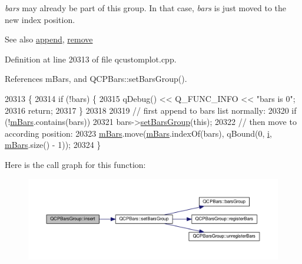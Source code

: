 {\itshape bars} may already be part of this group. In that case, {\itshape bars} is just moved to the new index position.

\begin{DoxySeeAlso}{See also}
\hyperlink{class_q_c_p_bars_group_a809ed63cc4ff7cd5b0b8c96b470163d3}{append}, \hyperlink{class_q_c_p_bars_group_a215e28a5944f1159013a0e19169220e7}{remove} 
\end{DoxySeeAlso}


Definition at line 20313 of file qcustomplot.\+cpp.



References m\+Bars, and Q\+C\+P\+Bars\+::set\+Bars\+Group().


\begin{DoxyCode}
20313                                               \{
20314   \textcolor{keywordflow}{if} (!bars) \{
20315     qDebug() << Q\_FUNC\_INFO << \textcolor{stringliteral}{"bars is 0"};
20316     \textcolor{keywordflow}{return};
20317   \}
20318 
20319   \textcolor{comment}{// first append to bars list normally:}
20320   \textcolor{keywordflow}{if} (!\hyperlink{class_q_c_p_bars_group_aa5affa0639c13e05bda9d23f16dd1393}{mBars}.contains(bars))
20321     bars->\hyperlink{class_q_c_p_bars_aedd1709061f0b307c47ddb45e172ef9a}{setBarsGroup}(\textcolor{keyword}{this});
20322   \textcolor{comment}{// then move to according position:}
20323   \hyperlink{class_q_c_p_bars_group_aa5affa0639c13e05bda9d23f16dd1393}{mBars}.move(\hyperlink{class_q_c_p_bars_group_aa5affa0639c13e05bda9d23f16dd1393}{mBars}.indexOf(bars), qBound(0, \hyperlink{_comparision_pictures_2_createtest_image_8m_a6f6ccfcf58b31cb6412107d9d5281426}{i}, \hyperlink{class_q_c_p_bars_group_aa5affa0639c13e05bda9d23f16dd1393}{mBars}.size() - 1));
20324 \}
\end{DoxyCode}


Here is the call graph for this function\+:\nopagebreak
\begin{figure}[H]
\begin{center}
\leavevmode
\includegraphics[width=350pt]{class_q_c_p_bars_group_a309a5f7233db189f3ea9c2d04ece6c13_cgraph}
\end{center}
\end{figure}


